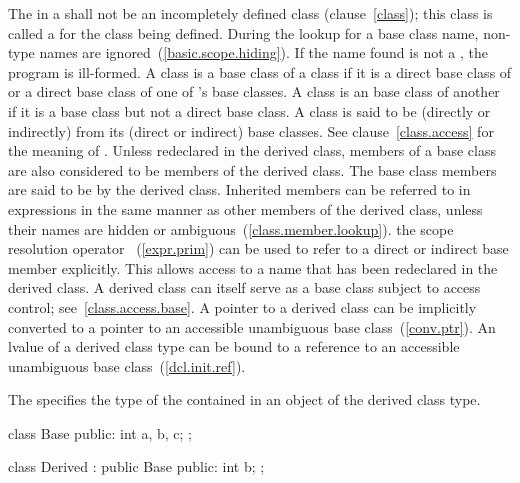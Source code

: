 %
The  in
a  shall not be
an
incompletely defined class (clause~\ref{class}); this class is called a
%
for the class being defined.
%
%
During the lookup for a base class name, non-type names are
ignored~(\ref{basic.scope.hiding}). If the name found is not a
, the program is ill-formed. A class  is a
base class of a class  if it is a direct base class of
 or a direct base class of one of 's base classes.
%
A class is an  base class of another if it is a base
class but not a direct base class. A class is said to be (directly or
indirectly)  from its (direct or indirect) base
classes.
\enternote
See clause~\ref{class.access} for the meaning of
.
\exitnote
{}%
Unless redeclared in the derived class, members of a base class are also
considered to be members of the derived class. The base class members
are said to be
%
by the derived class. Inherited members can be referred to in
expressions in the same manner as other members of the derived class,
unless their names are hidden or ambiguous~(\ref{class.member.lookup}).
%
\enternote
the scope resolution operator \tcode{::}~(\ref{expr.prim}) can be used
to refer to a direct or indirect base member explicitly. This allows
access to a name that has been redeclared in the derived class. A
derived class can itself serve as a base class subject to access
control; see~\ref{class.access.base}. A pointer to a derived class can be
implicitly converted to a pointer to an accessible unambiguous base
class~(\ref{conv.ptr}). An lvalue of a derived class type can be bound
to a reference to an accessible unambiguous base
class~(\ref{dcl.init.ref}).
\exitnote

\pnum
The  specifies the type of the
 contained in an
object of the derived class type.
\enterexample
{}%
\begin{codeblock}
class Base {
public:
    int a, b, c;
};
\end{codeblock}

\begin{codeblock}
class Derived : public Base {
public:
    int b;
};
\end{codeblock}

